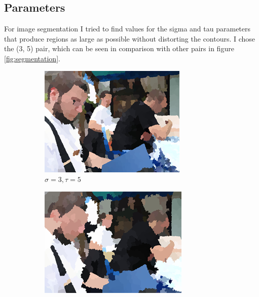 \documentclass[12pt]{report}
\begin{document}
	\subsection{Parameters}
	For image segmentation I tried to find values for the sigma and tau parameters that produce regions as large as possible without distorting the contours. I chose the (3, 5) pair, which can be seen in comparison with other pairs in figure \ref{fig:segmentation}.
	
	\begin{figure}[h!]
		\centering
		\begin{subfigure}[b]{0.3\linewidth}
			\includegraphics[width=\linewidth]{resources/segm_3_5.png}
			\caption{$\sigma = 3, \tau = 5$}
		\end{subfigure}
		\begin{subfigure}[b]{0.3\linewidth}
			\includegraphics[width=\linewidth]{resources/segm_2_10.png}

\end{subfigure}
\end{figure}
\end{document}
